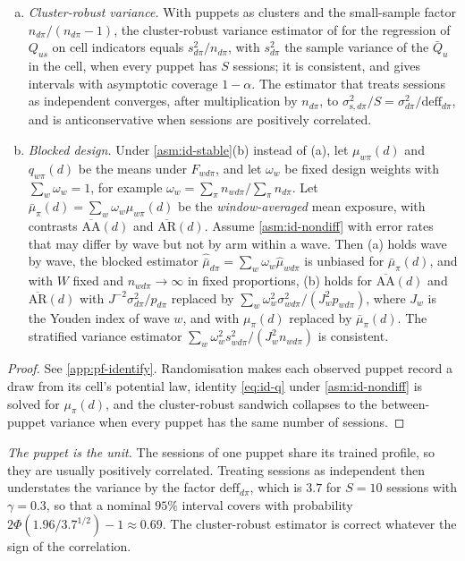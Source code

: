 \begin{theorem}
\begin{enumerate}[(a)]
  \item \emph{Cluster-robust variance.} With puppets as clusters and the small-sample factor $n_{d\pi}/(n_{d\pi}-1)$, the cluster-robust variance estimator of \citet{liang1986} for the regression of $Q_{us}$ on cell indicators equals $s^2_{d\pi}/n_{d\pi}$, with $s^2_{d\pi}$ the sample variance of the $\bar Q_u$ in the cell, when every puppet has $S$ sessions; it is consistent, and gives intervals with asymptotic coverage $1-\alpha$. The estimator that treats sessions as independent converges, after multiplication by $n_{d\pi}$, to $\sigma^2_{\mathrm s,d\pi}/S=\sigma^2_{d\pi}/\mathrm{deff}_{d\pi}$, and is anticonservative when sessions are positively correlated.
  \item \emph{Blocked design.} Under \cref{asm:id-stable}(b) instead of (a), let $\mu_{w\pi}(d)$ and $q_{w\pi}(d)$ be the means under $F_{wd\pi}$, and let $\omega_w$ be fixed design weights with $\sum_w\omega_w=1$, for example $\omega_w=\sum_\pi n_{wd\pi}/\sum_\pi n_{d\pi}$. Let $\bar\mu_\pi(d)=\sum_w\omega_w\mu_{w\pi}(d)$ be the \emph{window-averaged} mean exposure, with contrasts $\overline{\mathrm{AA}}(d)$ and $\overline{\mathrm{AR}}(d)$. Assume \cref{asm:id-nondiff} with error rates that may differ by wave but not by arm within a wave. Then (a) holds wave by wave, the blocked estimator $\widehat{\bar\mu}_{d\pi}=\sum_w\omega_w\widehat\mu_{wd\pi}$ is unbiased for $\bar\mu_\pi(d)$, and with $W$ fixed and $n_{wd\pi}\to\infty$ in fixed proportions, (b) holds for $\overline{\mathrm{AA}}(d)$ and $\overline{\mathrm{AR}}(d)$ with $J^{-2}\sigma^2_{d\pi}/p_{d\pi}$ replaced by $\sum_w\omega_w^2\sigma^2_{wd\pi}/(J_w^2p_{wd\pi})$, where $J_w$ is the Youden index of wave $w$, and with $\mu_\pi(d)$ replaced by $\bar\mu_\pi(d)$. The stratified variance estimator $\sum_w\omega_w^2s^2_{wd\pi}/(J_w^2n_{wd\pi})$ is consistent.
\end{enumerate}
\end{theorem}

\begin{proof}See \cref{app:pf-identify}. Randomisation makes each observed puppet record a draw from its cell's potential law, identity \eqref{eq:id-q} under \cref{asm:id-nondiff} is solved for $\mu_\pi(d)$, and the cluster-robust sandwich collapses to the between-puppet variance when every puppet has the same number of sessions.\end{proof}



\emph{The puppet is the unit.} The sessions of one puppet share its trained profile, so they are usually positively correlated. Treating sessions as independent then understates the variance by the factor $\mathrm{deff}_{d\pi}$, which is $3.7$ for $S=10$ sessions with $\gamma=0.3$, so that a nominal $95\%$ interval covers with probability $2\Phi(1.96/3.7^{1/2})-1\approx0.69$. The cluster-robust estimator is correct whatever the sign of the correlation.

